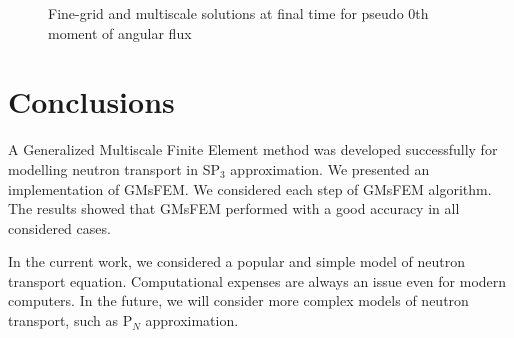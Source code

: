 \documentclass[preprint]{elsarticle}
\begin{document}
\begin{figure}[ht]
	\caption{Fine-grid and multiscale solutions at final time for pseudo 0th moment of angular flux}
	\label{twigl_solutions}
\end{figure}

\section{Conclusions}
A Generalized Multiscale Finite Element method was developed successfully for modelling neutron transport in SP$_3$ approximation. 
We presented an implementation of GMsFEM. 
We considered each step of GMsFEM algorithm.
The results showed that GMsFEM performed with a good accuracy in all considered cases.

In the current work, we considered a popular and simple model of neutron transport equation.
Computational expenses are always an issue even for modern computers.
In the future, we will consider more complex models of neutron transport, such as P$_N$ approximation.

\end{document}
